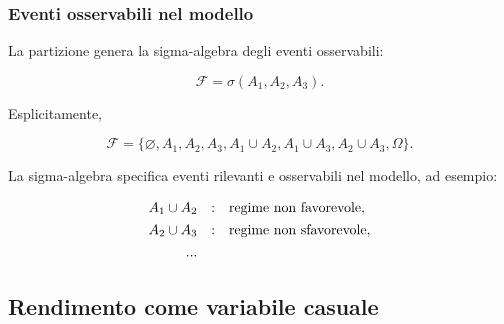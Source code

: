 \documentclass[handout]{beamer}%
\providecommand{\F}{\mathcal{F}}
\providecommand{\1}{\mathbf{1}}
\providecommand{\QTR}[2]{\csname #1\endcsname{#2}}
\begin{document}
\begin{frame}%
%

\frametitle{Eventi osservabili nel modello}%


La partizione genera la sigma-algebra degli eventi osservabili:%

\[
\F=\sigma(A_{1},A_{2},A_{3}).
\]


\medskip

Esplicitamente,%

\[
\F= \{\varnothing, A_{1},A_{2},A_{3}, A_{1}\cup A_{2},A_{1}\cup A_{3}%
,A_{2}\cup A_{3}, \Omega\}.
\]


\medskip

La sigma-algebra specifica eventi rilevanti e osservabili nel modello, ad esempio:

\medskip%

\[%
\begin{array}
[c]{rcl}%
A_{1}\cup A_{2} & : & \mbox{regime non favorevole},\\[4pt]%
A_{2}\cup A_{3} & : & \mbox{regime non sfavorevole},\\[4pt]%
... &  &
\end{array}
\]
%

\transboxout
\end{frame}%




\subsection{Rendimento come variabile casuale}%
\end{document}
